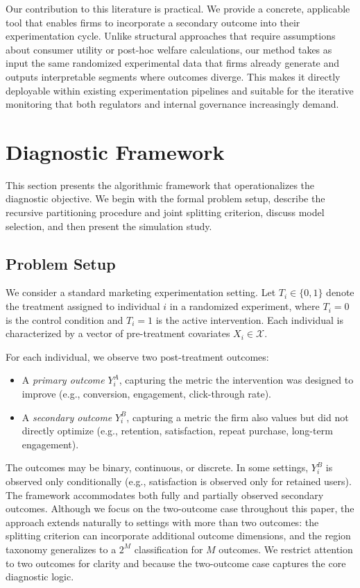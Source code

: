 \documentclass[11pt,letterpaper,english]{article}
\theoremstyle{definition}
\theoremstyle{definition}
\begin{document}
\begin{bibunit}
Our contribution to this literature is practical. We provide a concrete, applicable tool that enables firms to incorporate a secondary outcome into their experimentation cycle. Unlike structural approaches that require assumptions about consumer utility or post-hoc welfare calculations, our method takes as input the same randomized experimental data that firms already generate and outputs interpretable segments where outcomes diverge. This makes it directly deployable within existing experimentation pipelines and suitable for the iterative monitoring that both regulators and internal governance increasingly demand.


\section{Diagnostic Framework}
\label{sec:framework}

This section presents the algorithmic framework that operationalizes the diagnostic objective. We begin with the formal problem setup, describe the recursive partitioning procedure and joint splitting criterion, discuss model selection, and then present the simulation study.

\subsection{Problem Setup}
\label{sec:problem}

We consider a standard marketing experimentation setting. Let $T_i \in \{0,1\}$ denote the treatment assigned to individual $i$ in a randomized experiment, where $T_i=0$ is the control condition and $T_i=1$ is the active intervention. Each individual is characterized by a vector of pre-treatment covariates $X_i \in \mathcal{X}$.

For each individual, we observe two post-treatment outcomes:
\begin{itemize}[leftmargin=2em]
    \item A \emph{primary outcome} $Y_i^A$, capturing the metric the intervention was designed to improve (e.g., conversion, engagement, click-through rate).
    \item A \emph{secondary outcome} $Y_i^B$, capturing a metric the firm also values but did not directly optimize (e.g., retention, satisfaction, repeat purchase, long-term engagement).
\end{itemize}

The outcomes may be binary, continuous, or discrete. In some settings, $Y_i^B$ is observed only conditionally (e.g., satisfaction is observed only for retained users). The framework accommodates both fully and partially observed secondary outcomes. Although we focus on the two-outcome case throughout this paper, the approach extends naturally to settings with more than two outcomes: the splitting criterion can incorporate additional outcome dimensions, and the region taxonomy generalizes to a $2^M$ classification for $M$ outcomes. We restrict attention to two outcomes for clarity and because the two-outcome case captures the core diagnostic logic.


\end{bibunit}
\end{document}
